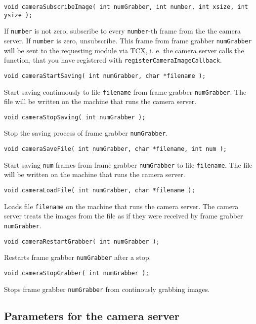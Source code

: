 \documentclass{article}
\begin{document}
\begin{description}
\item \texttt{void cameraSubscribeImage( int numGrabber, int number, int
    xsize, int ysize );}
  
  If \texttt{number} is not zero, subscribe to every \texttt{number}-th frame
  from the the camera server. If \texttt{number} is zero, unsubscribe. This
  frame from frame grabber \texttt{numGrabber} will be sent to the requesting
  module via TCX, i. e. the camera server calls the function, that you have
  registered with \texttt{registerCameraImageCallback}.
 
\item \texttt{void cameraStartSaving( int numGrabber, char *filename );} 
  
  Start saving continuously to file \texttt{filename} from frame grabber
  \texttt{numGrabber}. The file will be written on the machine that runs the
  camera server.
 
\item \texttt{void cameraStopSaving( int numGrabber );} 
  
  Stop the saving process of frame grabber \texttt{numGrabber}.
 
\item \texttt{void cameraSaveFile( int numGrabber, char *filename, int num );} 
  
  Start saving \texttt{num} frames from frame grabber \texttt{numGrabber} to
  file \texttt{filename}. The file will be written on the machine that runs
  the camera server.
 
\item \texttt{void cameraLoadFile( int numGrabber, char *filename );} 
  
  Loads file \texttt{filename} on the machine that runs the camera server.
  The camera server treats the images from the file as if they were received
  by frame grabber \texttt{numGrabber}.

\item \texttt{void cameraRestartGrabber( int numGrabber );} 
  
  Restarts frame grabber \texttt{numGrabber} after a stop.

\item \texttt{void cameraStopGrabber( int numGrabber );} 
  
  Stops frame grabber \texttt{numGrabber} from continously grabbing images.

\end{description}

\subsection{Parameters for the camera server}
\end{document}
